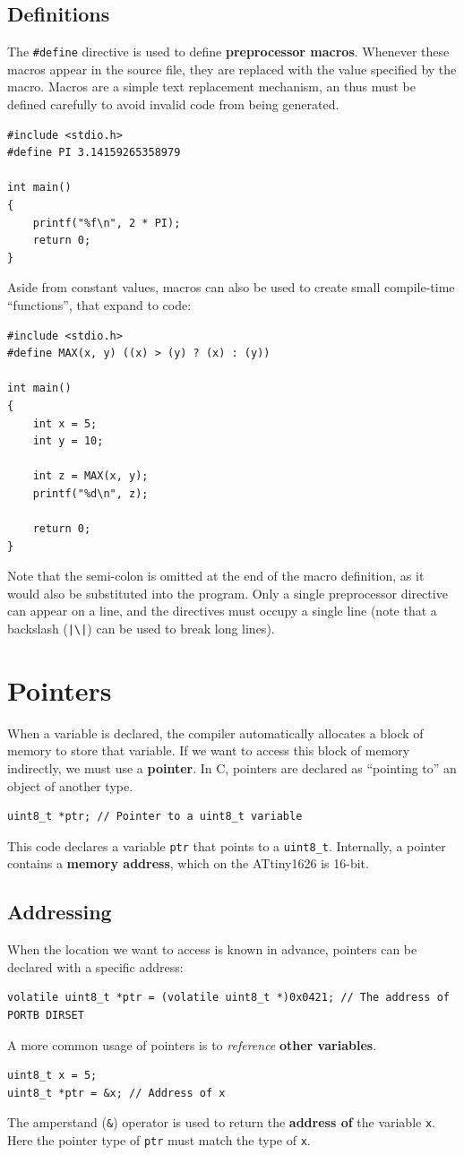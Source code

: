 \documentclass{report}
\begin{document}
\section{Definitions}
The \texttt{#define} directive is used to define \textbf{preprocessor macros}.
Whenever these macros appear in the source file, they are replaced with the value specified by the macro.
Macros are a simple text replacement mechanism, an thus must be defined carefully to avoid
invalid code from being generated.
\begin{verbatim}
#include <stdio.h>
#define PI 3.14159265358979

int main()
{
    printf("%f\n", 2 * PI);
    return 0;
}
\end{verbatim}
Aside from constant values, macros can also be used to create small compile-time ``functions'',
that expand to code:
\begin{verbatim}
#include <stdio.h>
#define MAX(x, y) ((x) > (y) ? (x) : (y))

int main()
{
    int x = 5;
    int y = 10;

    int z = MAX(x, y);
    printf("%d\n", z);

    return 0;
}
\end{verbatim}
Note that the semi-colon is omitted at the end of the macro definition,
as it would also be substituted into the program.
Only a single preprocessor directive can appear on a line, and the directives
must occupy a single line (note that a backslash (\texttt{|\backslash|}) can be used to break long lines). %
\chapter{Pointers}
When a variable is declared, the compiler automatically allocates a block of memory to store that variable.
If we want to access this block of memory indirectly, we must use a \textbf{pointer}.
In C, pointers are declared as ``pointing to'' an object of another type.
\begin{verbatim}
uint8_t *ptr; // Pointer to a uint8_t variable
\end{verbatim}
This code declares a variable \texttt{ptr} that points to a \texttt{uint8_t}.
Internally, a pointer contains a \textbf{memory address}, which on the ATtiny1626 is 16-bit.
\section{Addressing}
When the location we want to access is known in advance, pointers can be declared with a
specific address:
\begin{verbatim}
volatile uint8_t *ptr = (volatile uint8_t *)0x0421; // The address of PORTB DIRSET
\end{verbatim}
A more common usage of pointers is to \textit{reference} \textbf{other variables}.
\begin{verbatim}
uint8_t x = 5;
uint8_t *ptr = &x; // Address of x
\end{verbatim}
The amperstand (\texttt{&}) operator is used to return the \textbf{address of} the variable \texttt{x}.
Here the pointer type of \texttt{ptr} must match the type of \texttt{x}.
\end{document}
